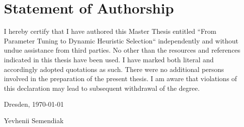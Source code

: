 \section*{\vfill{} \thispagestyle{empty}
Statement of Authorship}

I hereby certify that I have authored this Master Thesis entitled “From Parameter Tuning to Dynamic Heuristic Selection“ independently and without undue assistance from third parties. No other than the resources and references indicated in this thesis have been used. I have marked both literal and accordingly adopted quotations as such. There were no additional persons involved in the preparation of the present thesis. I am aware that violations of this declaration may lead to subsequent withdrawal of the degree.
\bigskip{}

\noindent Dresden, \today %
\vspace{2.5cm}

\noindent Yevhenii Semendiak \cleardoublepage{}
